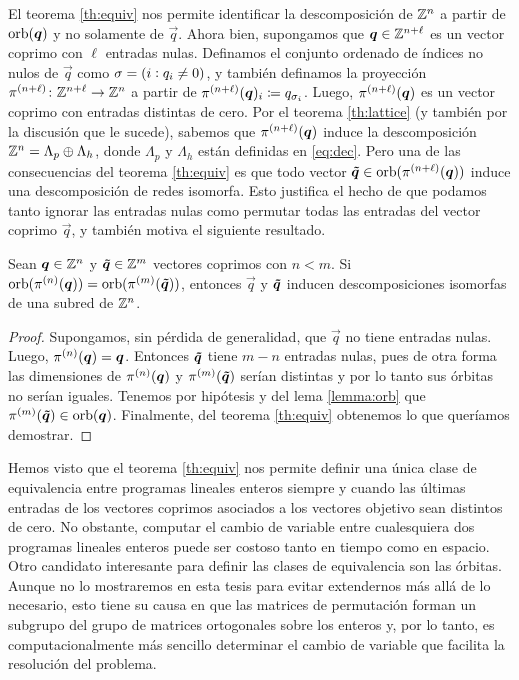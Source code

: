 
El teorema \ref{th:equiv} nos permite identificar la descomposición de $\mathbb{Z}^n$ a partir de
$\operatorname{orb}(\boldsymbol{q})$ y no solamente de $\vec{q}$. Ahora bien, supongamos que $\boldsymbol{q} \in \mathbb{Z}^{n + \ell}$
es un vector coprimo con $\ell$ entradas nulas. Definamos el conjunto ordenado de índices no nulos
de $\vec{q}$ como $\sigma = (i \vcentcolon q_i \neq 0)$, y también definamos la proyección $\pi^{(n
+ \ell)} \colon \mathbb{Z}^{n + \ell} \to \mathbb{Z}^{n}$ a partir de $\pi^{(n + \ell)}(\boldsymbol{q})_i \coloneq
q_{\sigma_i}$. Luego, $\pi^{(n + \ell)}(\boldsymbol{q})$ es un vector coprimo con entradas distintas de
cero. Por el teorema \ref{th:lattice} (y también por la discusión que le sucede), sabemos que
$\pi^{(n + \ell)}(\boldsymbol{q})$ induce la descomposición $\mathbb{Z}^n = \Lambda_p \oplus \Lambda_h$, donde
$\Lambda_p$ y $\Lambda_h$ están definidas en \eqref{eq:dec}. Pero una de las consecuencias del
teorema \ref{th:equiv} es que todo vector $\boldsymbol{\tilde{q}} \in \operatorname{orb}(\pi^{(n + \ell)}(\boldsymbol{q}))$ induce una
descomposición de redes isomorfa. Esto justifica el hecho de que podamos tanto ignorar las entradas nulas
como permutar todas las entradas del vector coprimo $\vec{q}$, y también motiva el siguiente resultado.
\begin{theorem}
	\label{th:isoclass}
	Sean $\boldsymbol{q} \in \mathbb{Z}^n$ y $\boldsymbol{\tilde{q}} \in \mathbb{Z}^m$ vectores coprimos con $n < m$.
	Si $\operatorname{orb}(\pi^{(n)}(\boldsymbol{q})) = \operatorname{orb}(\pi^{(m)}(\boldsymbol{\tilde{q}}))$, entonces $\vec{q}$ y $\boldsymbol{\tilde{q}}$
	inducen descomposiciones isomorfas de una subred de $\mathbb{Z}^n$.
\end{theorem}
\begin{proof}
	Supongamos, sin pérdida de generalidad, que $\vec{q}$ no tiene entradas nulas. Luego,
	$\pi^{(n)}(\boldsymbol{q}) = \boldsymbol{q}$. Entonces $\boldsymbol{\tilde{q}}$ tiene $m - n$ entradas nulas, pues de otra
	forma las dimensiones de $\pi^{(n)}(\boldsymbol{q})$ y $\pi^{(m)}(\boldsymbol{\tilde{q}})$ serían distintas y por lo
	tanto sus órbitas no serían iguales. Tenemos por hipótesis y del lema \ref{lemma:orb} que
	$\pi^{(m)}(\boldsymbol{\tilde{q}}) \in \operatorname{orb}(\boldsymbol{q})$. Finalmente, del teorema \ref{th:equiv} obtenemos lo que
	queríamos demostrar.
\end{proof}

Hemos visto que el teorema \ref{th:equiv} nos permite definir una única clase de equivalencia entre
programas lineales enteros siempre y cuando las últimas entradas de los vectores coprimos asociados
a los vectores objetivo sean distintos de cero. No obstante, computar el cambio de variable entre
cualesquiera dos programas lineales enteros puede ser costoso tanto en tiempo como en espacio. Otro
candidato interesante para definir las clases de equivalencia son las órbitas. Aunque no lo
mostraremos en esta tesis para evitar extendernos más allá de lo necesario, esto tiene su causa en
que las matrices de permutación forman un subgrupo del grupo de matrices ortogonales sobre los
enteros y, por lo tanto, es computacionalmente más sencillo determinar el cambio de variable que
facilita la resolución del problema.

